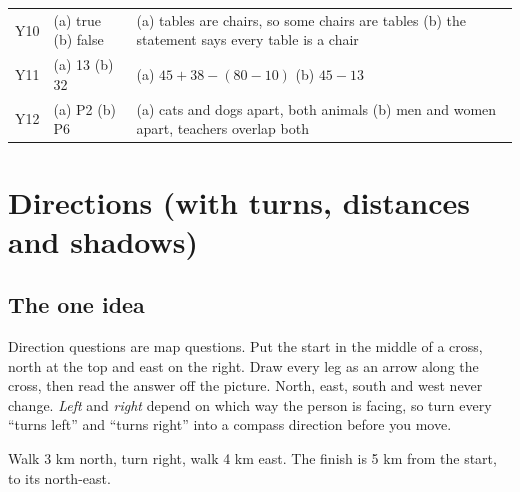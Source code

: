 \documentclass[11pt,a4paper]{article}
\let\oldsubsection\subsection
\renewcommand{\subsection}{\needspace{9\baselineskip}\oldsubsection}
\begin{document}
\begin{center}
\begin{tabularx}{\linewidth}{@{}l>{\raggedright\arraybackslash}X>{\raggedright\arraybackslash}X@{}}
Y10 & (a) true \newline (b) false & (a) tables are chairs, so some chairs are tables \newline (b) the statement says every table is a chair \\
Y11 & (a) 13 \newline (b) 32 & (a) $45 + 38 - (80 - 10)$ \newline (b) $45 - 13$ \\
Y12 & (a) P2 \newline (b) P6 & (a) cats and dogs apart, both animals \newline (b) men and women apart, teachers overlap both \\
\bottomrule
\end{tabularx}\end{center}

\clearpage
\section[Directions (D1--D12)]{Directions (with turns, distances and shadows)}\label{ch:D}

\subsection*{The one idea}
Direction questions are map questions. Put the start in the middle of a cross, north at the top and east on the right. Draw every leg as an arrow along the cross, then read the answer off the picture. North, east, south and west never change. \emph{Left} and \emph{right} depend on which way the person is facing, so turn every ``turns left'' and ``turns right'' into a compass direction before you move.

\begin{center}
\par\nopagebreak\smallskip
{\small Walk 3 km north, turn right, walk 4 km east. The finish is 5 km from the start, to its north-east.}
\end{center}
\end{document}
